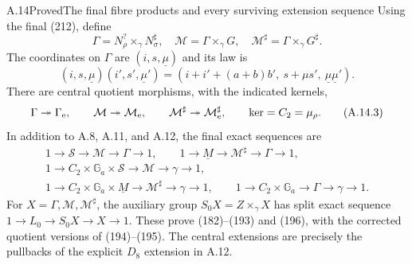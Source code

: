 \begin{statement}{A.14}{Proved}{The final fibre products and every surviving extension sequence}
Using the final (212), define
\[
 \Gamma=N_\rho^?\times_\gamma N_\sigma^\sharp,
 \quad \mathcal M=\Gamma\times_\gamma G,
 \quad \mathcal M^\sharp=\Gamma\times_\gamma G^\sharp.
                                                               \tag{A.14.1}
\]
The coordinates on $\Gamma$ are $(i,s,\underline\mu)$ and its law is
\[
 (i,s,\underline\mu)(i',s',\underline\mu')
  =(i+i'+(a+b)b',\ s+\mu s',\
       \underline\mu\underline\mu').              \tag{A.14.2}
\]
There are central quotient morphisms, with the indicated kernels,
\[
 \Gamma\twoheadrightarrow\Gamma_{\rm e},\qquad
 \mathcal M\twoheadrightarrow\mathcal M_{\rm e},\qquad
 \mathcal M^\sharp\twoheadrightarrow\mathcal M_{\rm e}^\sharp,
 \qquad\ker=C_2=\mu_\rho.                         \tag{A.14.3}
\]
In addition to A.8, A.11, and A.12, the final exact sequences are
\[
\begin{gathered}
1\to\mathcal S\to\mathcal M\to\Gamma\to1,\qquad
1\to\underline M\to\mathcal M^\sharp\to\Gamma\to1,\\
1\to C_2\times\mathbb G_a\times\mathcal S
 \to\mathcal M\to\gamma\to1,\\
1\to C_2\times\mathbb G_a\times\underline M
 \to\mathcal M^\sharp\to\gamma\to1,\qquad
1\to C_2\times\mathbb G_a\to\Gamma\to\gamma\to1.
\end{gathered}                                                     \tag{A.14.4}
\]
For $X=\Gamma,\mathcal M,\mathcal M^\sharp$, the auxiliary group
$S_0X=Z\times_\gamma X$ has split exact sequence
$1\to L_0\to S_0X\to X\to1$.
These prove (182)--(193) and (196), with the corrected quotient
versions of (194)--(195). The central extensions are precisely the
pullbacks of the explicit $D_8$ extension in A.12.
\end{statement}
